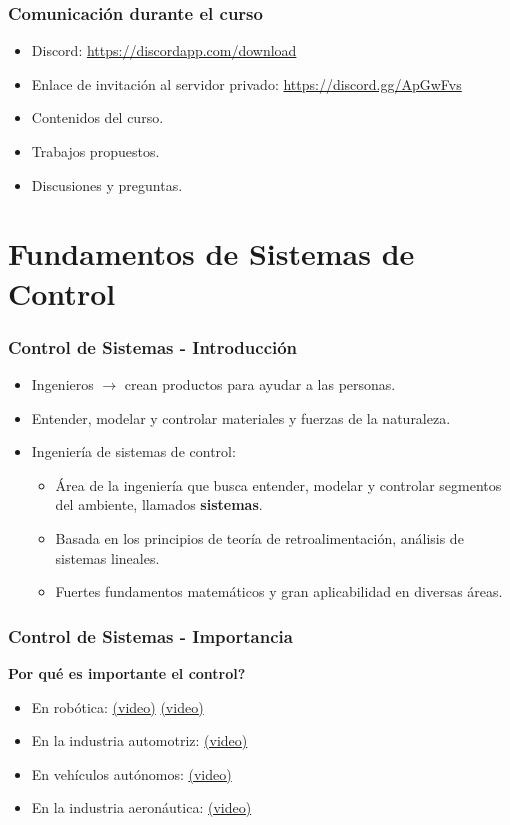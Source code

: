 \documentclass[aspectratio=169,handout]{beamer}
\theoremstyle{definition}
\theoremstyle{plain}
\theoremstyle{remark}
\begin{document}
\begin{frame}[c]\frametitle{Comunicación durante el curso}
\begin{itemize}
  \item Discord: \url{https://discordapp.com/download}
  \item Enlace de invitación al servidor privado: \url{https://discord.gg/ApGwFvs}
  \item Contenidos del curso.
  \item Trabajos propuestos.
  \item Discusiones y preguntas.
\end{itemize}
\end{frame}

\section{Fundamentos de Sistemas de Control}

\begin{frame}[<+->][c]\frametitle{Control de Sistemas - Introducción}
\begin{itemize}
  \item Ingenieros $\rightarrow$ crean productos para ayudar a las personas.
  \item Entender, modelar y controlar materiales y fuerzas de la naturaleza.
  \item Ingeniería de sistemas de control:
  \begin{itemize}
    \item Área de la ingeniería que busca entender, modelar y controlar segmentos del ambiente, llamados \textbf{sistemas}.
    \item Basada en los principios de teoría de retroalimentación, análisis de sistemas lineales.
    \item Fuertes fundamentos matemáticos y gran aplicabilidad en diversas áreas.
  \end{itemize}
\end{itemize}
\end{frame}

\begin{frame}[c]\frametitle{Control de Sistemas - Importancia}
\textbf{Por qué es importante el control?}
\begin{itemize}
  \item En robótica: \href{https://www.youtube.com/watch?v=wlkCQXHEgjA}{(video)} \href{https://www.youtube.com/watch?v=_sBBaNYex3E}{(video)}
  \item En la industria automotriz: \href{https://www.youtube.com/watch?v=rbki4HR41-4}{(video)}
  \item En vehículos autónomos: \href{https://www.youtube.com/watch?v=tlThdr3O5Qo}{(video)}
  \item En la industria aeronáutica: \href{https://www.youtube.com/watch?v=GrP3jHuLQ9o}{(video)}
\end{itemize}
\end{frame}
\end{document}
